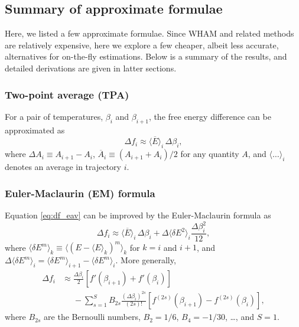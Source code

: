 \documentclass[aip,jcp,preprint,notitlepage, superscriptaddress]{revtex4-1}
\begin{document}
\subsection{Summary of approximate formulae}

Here, we listed a few approximate formulae.
%
Since WHAM and related methods
are relatively expensive,
here we explore a few cheaper,
albeit less accurate, alternatives
for on-the-fly estimations\cite{park2007}.
%
Below is a summary of the results,
and detailed derivations are given in latter sections.








\subsubsection{Two-point average (TPA)}



For a pair of temperatures,
$\beta_i$ and $\beta_{i+1}$,
the free energy difference
can be approximated as\cite{park2007}
%
\begin{equation}
\Delta f_i
\approx
\overline{ \langle E \rangle }_i \, \Delta \beta_i,
\label{eq:df_eav}
\end{equation}
%
where
$\Delta A_i \equiv A_{i+1} - A_i$,
$\overline{ A }_i \equiv (A_{i+1} + A_i)/2$
for any quantity $A$,
and
$\langle\dots\rangle_i$
denotes an average in trajectory $i$.
%


\subsubsection{Euler-Maclaurin (EM) formula}



Equation \eqref{eq:df_eav} can be improved
by the Euler-Maclaurin formula\cite{
arfken, whittaker, wang_specfunc}
as
%
\begin{equation}
\Delta f_i
\approx
\overline{ \langle E \rangle }_i \, \Delta \beta_i
+
\Delta \langle \delta E^2 \rangle_i
\frac{ \Delta \beta_i^2 }{ 12 },
\label{eq:df_eavb}
\end{equation}
where
$\langle \delta E^m \rangle_k
\equiv \langle (E - \langle E \rangle_k)^m \rangle_k$
for $k = i$ and $i + 1$,
and
$\Delta \langle \delta E^m \rangle_i
= \langle \delta E^m \rangle_{i + 1}
- \langle \delta E^m \rangle_{i}$.
%
More generally,
%
\begin{align*}
\Delta f_i
&\approx
\frac{\Delta \beta_i}{2}
\left[
  f'(\beta_{i+1}) + f'(\beta_i)
\right]
\\
&\phantom{=}
-
\sum_{s = 1}^{S}
  B_{2s}
  \frac{ (\Delta \beta_i)^{2s} } { (2 s)! }
  \left[
    f^{(2s)}(\beta_{i+1})
    -
    f^{(2s)}(\beta_i)
  \right],
\end{align*}
%
where $B_{2s}$ are the Bernoulli numbers,
$B_2 = 1/6$, $B_4 = -1/30$, \ldots,
and $S = 1$.
\end{document}
